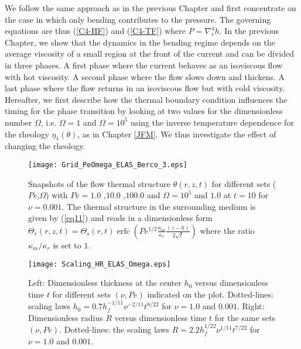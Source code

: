 We  follow the  same approach  as in  the previous  Chapter and  first
concentrate  on the  case in  which  only bending  contributes to  the
pressure.   The   governing  equations  are  thus   (\ref{C4-HF})  and
(\ref{C4-TF}) where  $P =  \nabla_r^4h$. In  the previous  Chapter, we
show that  the dynamics in the  bending regime depends on  the average
viscosity of  a small region  at the front of  the current and  can be
divided in three phases. A first phase where the current behaves as an
isoviscous flow  with hot  viscosity.  A second  phase where  the flow
slows down  and thickens.  A last  phase where the flow  returns in an
isoviscous flow but with cold viscosity.  Hereafter, we first describe
how the thermal boundary condition influences the timing for the phase
transition  by looking  at  two values  for  the dimensionless  number
$\Omega$,  i.e.   $\Omega=1$  and   $\Omega=10^5$  using  the  inverse
temperature  dependence  for  the  rheology  $\eta_1(\theta)$,  as  in
Chapter  \ref{JFM}. We  thus investigate  the effect  of changing  the
rheology.

\begin{figure}
  \begin{center}
    \graphicspath{ {/Users/thorey/Documents/These/Projet/Refroidissement/Skin_Model/Figure/Figure_Heating/} }
    \texttt{[image: Grid\_PeOmega\_ELAS\_Berco\_3.eps]}
    \caption{Snapshots of  the flow thermal  structure $\theta(r,z,t)$
      for  different  sets  ($Pe$,$\Omega$)  with  $Pe=  1.0$  ,$10.0$
      ,$100.0$   and   $\Omega=10^5$   and   $1.0$   at   $t=10$   for
      $\nu=0.001$. The thermal structure  in the surrounding medium is
      given  by  (\ref{eq11})  and   reads  in  a  dimensionless  form
      $\Theta_r(r,z,t)=\Theta_s(r,t)\operatorname{erfc}{\left(Pe^{1/2}\frac{\kappa_m}{\kappa_r}\frac{(z-h)}{2\sqrt{t}}\right)}$
      where the ratio $\kappa_m/\kappa_r$ is set to $1$.}
    \label{Grid_PeOmega_Heating}
  \end{center}
\end{figure}

\begin{figure}
  \begin{center}
    \graphicspath{ {/Users/thorey/Documents/These/Projet/Refroidissement/Skin_Model/Figure/Figure_Heating/} }
    \texttt{[image: Scaling\_HR\_ELAS\_Omega.eps]}
    \caption{Left: Dimensionless thickness at  the center $h_0$ versus
      dimensionless time  $t$ for different sets  $(\nu,Pe)$ indicated
      on      the      plot.      Dotted-lines:      scaling      laws
      $h_0=  0.7h_f^{-1/11}\nu^{-2/11}t^{8/22}$ for  $\nu  = 1.0$  and
      $0.001$.  Right:  Dimensionless radius $R$  versus dimensionless
      time  $t$  for  the  same sets  $(\nu,Pe)$.   Dotted-lines:  the
      scaling    laws    $R=   2.2h_f^{1/22}\nu^{1/11}t^{7/22}$    for
      $\nu = 1.0$ and $0.001$.}
    \label{Scaling_HR_ELAS_Omega}
  \end{center}
\end{figure}
